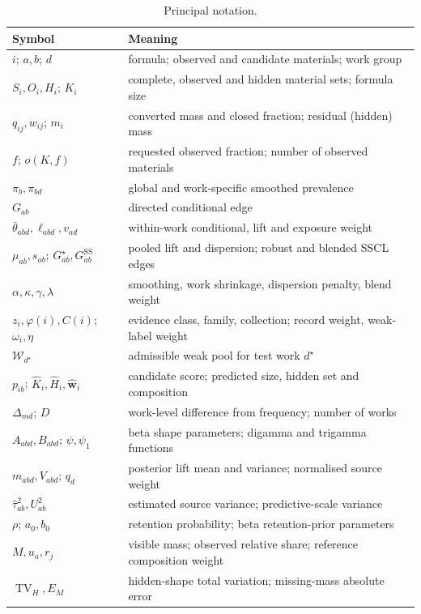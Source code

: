 \documentclass[applsci,article,submit,oneauthor]{Definitions/mdpi}
\newcommand{\fmly}{\varphi}
\begin{document}
\begin{table}[H]
\caption{Principal notation.}
\label{tab:notation}
\small
\begin{tabularx}{\textwidth}{lL}
\toprule
\textbf{Symbol} & \textbf{Meaning} \\
\midrule
$i$; $a,b$; $d$ & formula; observed and candidate materials; work group \\
$S_i,O_i,H_i$; $K_i$ & complete, observed and hidden material sets; formula size \\
$q_{ij},w_{ij}$; $m_i$ & converted mass and closed fraction; residual (hidden) mass \\
$f$; $o(K,f)$ & requested observed fraction; number of observed materials \\
$\pi_b,\pi_{bd}$ & global and work-specific smoothed prevalence \\
$G_{ab}$ & directed conditional edge \\
$\bar\theta_{abd},\ell_{abd},v_{ad}$ & within-work conditional, lift and exposure weight \\
$\mu_{ab},s_{ab}$; $G^\star_{ab},G^{\mathrm{SS}}_{ab}$ & pooled lift and dispersion; robust and blended SSCL edges \\
$\alpha,\kappa,\gamma,\lambda$ & smoothing, work shrinkage, dispersion penalty, blend weight \\
$z_i,\fmly(i),C(i)$; $\omega_i,\eta$ & evidence class, family, collection; record weight, weak-label weight \\
$\mathcal W_{d^\star}$ & admissible weak pool for test work $d^\star$ \\
$p_{ib}$; $\widehat K_i,\widehat H_i,\widehat{\bm w}_i$ & candidate score; predicted size, hidden set and composition \\
$\Delta_{md}$; $D$ & work-level difference from frequency; number of works \\
$A_{abd},B_{abd}$; $\psi,\psi_1$ & beta shape parameters; digamma and trigamma functions \\
$m_{abd},V_{abd}$; $q_d$ & posterior lift mean and variance; normalised source weight \\
$\widehat\tau_{ab}^2,U_{ab}^2$ & estimated source variance; predictive-scale variance \\
$\rho$; $a_0,b_0$ & retention probability; beta retention-prior parameters \\
$M,u_a,r_j$ & visible mass; observed relative share; reference composition weight \\
$\operatorname{TV}_H,E_M$ & hidden-shape total variation; missing-mass absolute error \\
\bottomrule
\end{tabularx}
\end{table}
\end{document}

